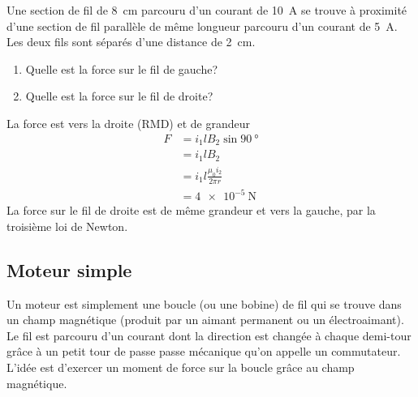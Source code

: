 \begin{diapobox}
  Une section de fil de \SI{8}{\centi\meter} parcouru d'un courant de
  \SI{10}{\ampere} se trouve à proximité d'une section de fil parallèle de même
  longueur parcouru d'un courant de \SI{5}{\ampere}. Les deux fils sont séparés
  d'une distance de \SI{2}{\centi\meter}.
  \begin{enumerate}
    \item Quelle est la force sur le fil de gauche?
    \item Quelle est la force sur le fil de droite?
  \end{enumerate}

\end{diapobox}

\begin{reponsebox}
  La force est vers la droite (RMD) et de grandeur
  \begin{align*}
    F &= i_1lB_2 \sin\SI{90}{\degree}  \\
      &= i_1lB_2  \\
      &= i_1 l \frac{\mu_0 i_2}{2\pi r}  \\
      &= \SI{4e-5}{\newton}
  \end{align*}
  La force sur le fil de droite est de même grandeur et vers la gauche, par la
  troisième loi de Newton.
\end{reponsebox}


\subsection{Moteur simple}


Un moteur est simplement une boucle (ou une bobine) de fil qui se trouve dans
un champ magnétique (produit par un aimant permanent ou un électroaimant). Le
fil est parcouru d'un courant dont la direction est changée à chaque demi-tour
grâce à un petit tour de passe passe mécanique qu'on appelle un commutateur.
L'idée est d'exercer un moment de force sur la boucle grâce au champ
magnétique.

